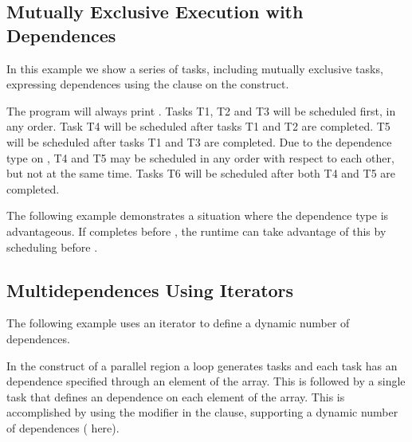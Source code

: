 

\pagebreak
\subsection{Mutually Exclusive Execution with Dependences}
\label{subsec:task_dep_mutexinoutset}

In this example we show a series of tasks, including mutually exclusive
tasks, expressing dependences using the  clause on the
 construct.

The program will always print . Tasks T1, T2 and T3 will be scheduled first,
in any order. Task T4 will be scheduled after tasks T1 and T2 are
completed. T5 will be scheduled after tasks T1 and T3 are completed. Due
to the  dependence type on , T4 and T5 may be
scheduled in any order with respect to each other, but not at the same
time. Tasks T6 will be scheduled after both T4 and T5 are completed.



The following example demonstrates a situation where the 
dependence type is advantageous. If  completes
before , the runtime can take advantage of this by
scheduling  before .



\subsection{Multidependences Using Iterators}
\label{subsec:depend_iterator}

The following example uses an iterator to define a dynamic number of
dependences.

In the  construct of a parallel region a loop generates  tasks
and each task has an  dependence specified through an element of
the  array.  This is followed by a single task that defines an 
dependence on each element of the array.  This is accomplished by
using the  modifier in the  clause, supporting a dynamic number
of dependences ( here).

